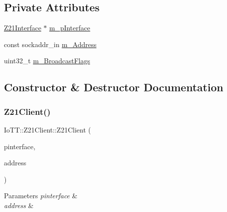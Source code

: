 \subsection*{Private Attributes}
\begin{DoxyCompactItemize}
\item 
\hyperlink{classIoTT_1_1Z21Interface}{Z21\+Interface} $\ast$ \hyperlink{classIoTT_1_1Z21Client_aead27a2871dd26028e39e22ecbd081a2}{m\+\_\+p\+Interface}
\item 
const sockaddr\+\_\+in \hyperlink{classIoTT_1_1Z21Client_aa16674a0a9c8f96579f6e312046e30c5}{m\+\_\+\+Address}
\item 
uint32\+\_\+t \hyperlink{classIoTT_1_1Z21Client_abc8fafaf080eb88a735f1d8d7d97fa6f}{m\+\_\+\+Broadcast\+Flags}
\end{DoxyCompactItemize}


\subsection{Constructor \& Destructor Documentation}
\mbox{\label{classIoTT_1_1Z21Client_ac1d627c4d3c9679a4cd00e0ea79ee3cb}} 
\subsubsection{\texorpdfstring{Z21\+Client()}{Z21Client()}}
{\footnotesize\ttfamily Io\+T\+T\+::\+Z21\+Client\+::\+Z21\+Client (\begin{DoxyParamCaption}\item[{\hyperlink{classIoTT_1_1Z21Interface}{Z21\+Interface} $\ast$}]{pinterface,  }\item[{const sockaddr\+\_\+in \&}]{address }\end{DoxyParamCaption})}


\begin{DoxyParams}{Parameters}
{\em pinterface} & \\
\hline
{\em address} & \\
\hline
\end{DoxyParams}
\mbox{\label{classIoTT_1_1Z21Client_a265ac239fe9334d8f856ee99f3a57be9}} 
